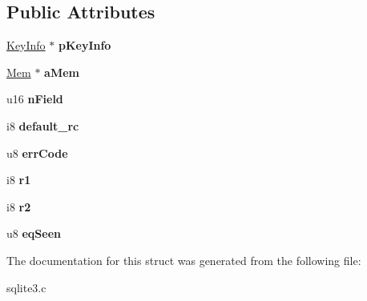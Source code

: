 \subsection*{Public Attributes}
\begin{DoxyCompactItemize}
\item 
\hyperlink{structKeyInfo}{Key\+Info} $\ast$ {\bfseries p\+Key\+Info}\hypertarget{structUnpackedRecord_aeb43e7a1e300857cab2cbe98eacd575b}{}\label{structUnpackedRecord_aeb43e7a1e300857cab2cbe98eacd575b}

\item 
\hyperlink{structMem}{Mem} $\ast$ {\bfseries a\+Mem}\hypertarget{structUnpackedRecord_a3299c322ceb8b758dacc59701021ae9f}{}\label{structUnpackedRecord_a3299c322ceb8b758dacc59701021ae9f}

\item 
u16 {\bfseries n\+Field}\hypertarget{structUnpackedRecord_a2c5062735cdbc5039679d255cc900668}{}\label{structUnpackedRecord_a2c5062735cdbc5039679d255cc900668}

\item 
i8 {\bfseries default\+\_\+rc}\hypertarget{structUnpackedRecord_a8f18c6e59de409bf543de0965652faa9}{}\label{structUnpackedRecord_a8f18c6e59de409bf543de0965652faa9}

\item 
u8 {\bfseries err\+Code}\hypertarget{structUnpackedRecord_a5c42d9878256f14c87f0e099b31da4bb}{}\label{structUnpackedRecord_a5c42d9878256f14c87f0e099b31da4bb}

\item 
i8 {\bfseries r1}\hypertarget{structUnpackedRecord_aff1dc6903bbc46b232d912bd25683b8a}{}\label{structUnpackedRecord_aff1dc6903bbc46b232d912bd25683b8a}

\item 
i8 {\bfseries r2}\hypertarget{structUnpackedRecord_a57a0cc8800e409d46c7c804bc68b5b2b}{}\label{structUnpackedRecord_a57a0cc8800e409d46c7c804bc68b5b2b}

\item 
u8 {\bfseries eq\+Seen}\hypertarget{structUnpackedRecord_a2efeb544b71d5e6c98b39ac845380e4e}{}\label{structUnpackedRecord_a2efeb544b71d5e6c98b39ac845380e4e}

\end{DoxyCompactItemize}


The documentation for this struct was generated from the following file\+:\begin{DoxyCompactItemize}
\item 
sqlite3.\+c\end{DoxyCompactItemize}
